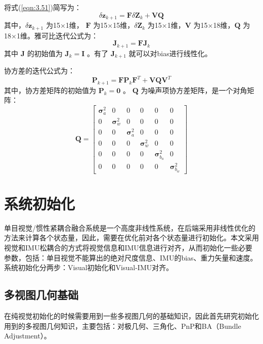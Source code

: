 将式(\ref{eqn:3.51})简写为：
\begin{equation}
\label{eqn:3.54}
\delta \mathbf{z}_{k+1} =\mathbf{F} \delta \mathbf{Z}_{k} + \mathbf{V} \mathbf{Q}
\end{equation}
其中，$\delta \mathbf{z}_{k+1}$ 为15×1维， $\mathbf{F}$ 为15×15维，$\delta \mathbf{Z}_{k} $ 为15×1维，$\mathbf{V} $ 为15×18维，$\mathbf{Q} $ 为18×1维。雅可比迭代公式为：
\begin{equation}
\label{eqn:3.55}
\mathbf{J}_{k+1} = \mathbf{F} \mathbf{J}_{k}
\end{equation}
其中 $\mathbf{J} $ 的初始值为 $\mathbf{J}_k =\mathbf{I} $ 。有了 $\mathbf{J}_{k+1} $ 就可以对bias进行线性化。

协方差的迭代公式为：
\begin{equation}
\label{eqn:3.56}
\mathbf{ P}_{k+1} 
=\mathbf{F} \mathbf{P}_{k} \mathbf{F}^{T}+\mathbf{V} \mathbf{Q} \mathbf{V}^{T}
\end{equation}
其中，协方差矩阵的初始值为 $\mathbf{P}_k=\mathbf{0} $ 。 $\mathbf{Q} $ 为噪声项协方差矩阵，是一个对角矩阵：
\begin{equation}
\label{eqn:3.57}
\mathbf{Q}=\left[ \begin{array}{cccccc}
{\bm{\sigma}_{a}^{2}} & {0} & {0} & {0} & {0} & {0} \\ 
{0} & {\bm{\sigma}_{w}^{2}} & {0} & {0} & {0} & {0} \\ 
{0} & {0} & {\bm{\sigma}_{a}^{2}} & {0} & {0} & {0} \\ 
{0} & {0} & {0} & {\bm{\sigma}_{w}^{2}} & {0} & {0} \\ 
{0} & {0} & {0} & {0} & {\bm{\sigma}_{b_{a}}^{2}} & {0} \\ 
{0} & {0} & {0} & {0} & {0} & {\bm{\sigma}_{b_{w}}^{2}}
\end{array}\right]
\end{equation}
\section{系统初始化}
单目视觉/惯性紧耦合融合系统是一个高度非线性系统，在后端采用非线性优化的方法来计算各个状态量，因此，需要在优化前对各个状态量进行初始化。本文采用视觉和IMU松耦合的方式将视觉信息和IMU信息进行对齐，从而初始化一些必要参数，包括：单目视觉不能算出的绝对尺度信息、IMU的bias、重力矢量和速度。系统初始化分两步：Visual初始化和Visual-IMU对齐。
\subsection{多视图几何基础}
在纯视觉初始化的时候需要用到一些多视图几何的基础知识，因此首先研究初始化用到的多视图几何知识，主要包括：对极几何、三角化、PnP和BA（Bundle Adjustment）。

